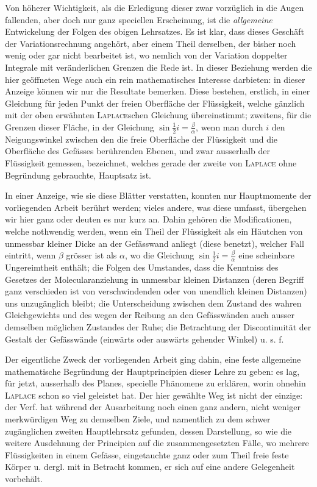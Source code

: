 Von höherer Wichtigkeit, als die Erledigung dieser zwar vorzüglich in die
Augen fallenden, aber doch nur ganz speciellen Erscheinung, ist die
\textit{allgemeine} Entwickelung der Folgen des obigen Lehrsatzes. Es ist klar,
dass dieses Geschäft der Variationsrechnung angehört, aber einem Theil derselben,
der bisher noch wenig oder gar nicht bearbeitet ist, wo nemlich von der
Variation doppelter Integrale mit veränderlichen Grenzen die Rede ist.
In dieser Beziehung werden die hier geöffneten Wege auch ein rein mathematisches
Interesse darbieten: in dieser Anzeige können wir nur die Resultate bemerken.
Diese bestehen, erstlich,
\clearpage
{}
\noindent
in einer Gleichung für jeden Punkt der freien Oberfläche der Flüssigkeit,
welche gänzlich mit der oben erwähnten \textsc{Laplace}schen Gleichung übereinstimmt;
zweitens, für die Grenzen dieser Fläche, in der Gleichung
$\sin\frac12 i=\frac{\beta}{\alpha}$, wenn man durch $i$ den Neigungswinkel
zwischen den die freie Oberfläche der Flüssigkeit und die Oberfläche des
Gefässes berührenden Ebenen, und zwar ausserhalb der Flüssigkeit gemessen,
bezeichnet, welches gerade der zweite von \textsc{Laplace} ohne Begründung
gebrauchte, Hauptsatz ist.

In einer Anzeige, wie sie diese Blätter verstatten, konnten nur Hauptmomente
der vorliegenden Arbeit berührt werden; vieles andere, was diese umfasst,
übergehen wir hier ganz oder deuten es nur kurz an. Dahin gehören die
Modificationen, welche nothwendig werden, wenn ein Theil der Flüssigkeit als
ein Häutchen von unmessbar kleiner Dicke an der Gefässwand anliegt (diese
benetzt), welcher Fall eintritt, wenn $\beta$ grösser ist als $\alpha$, wo
die Gleichung $\sin\frac12 i=\frac{\beta}{\alpha}$ eine scheinbare Ungereimtheit
enthält; die Folgen des Umstandes, dass die Kenntniss des Gesetzes der
Molecularanziehung in unmessbar kleinen Distanzen (deren Begriff ganz verschieden
ist von verschwindenden oder von unendlich kleinen Distanzen) uns unzugänglich
bleibt; die Unterscheidung zwischen dem Zustand des wahren Gleichgewichts und
des wegen der Reibung an den Gefässwänden auch ausser demselben möglichen
Zustandes der Ruhe; die Betrachtung der Discontinuität der Gestalt der
Gefässwände (einwärts oder auswärts gehender Winkel) u. s. f.

Der eigentliche Zweck der vorliegenden Arbeit ging dahin, eine feste allgemeine
mathematische Begründung der Hauptprincipien dieser Lehre zu geben: es lag,
für jetzt, ausserhalb des Planes, specielle Phänomene zu erklären, worin
ohnehin \textsc{Laplace} schon so viel geleistet hat. Der hier gewählte Weg
ist nicht der einzige: der Verf. hat während der Ausarbeitung noch einen ganz
andern, nicht weniger merkwürdigen Weg zu demselben Ziele, und namentlich zu
dem schwer zugänglichen zweiten Hauptlehrsatz gefunden, dessen Darstellung,
so wie die weitere Ausdehnung der Principien auf die zusammengesetzten Fälle,
wo mehrere Flüssigkeiten in einem Gefässe, eingetauchte ganz oder zum Theil
freie feste Körper u. dergl. mit in Betracht kommen, er sich auf eine andere
Gelegenheit vorbehält.
